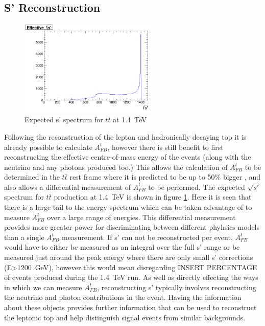 \subsection{S' Reconstruction}

\begin{figure}
  \centering
  \includegraphics[width=0.6\textwidth]{figures/RawSPrime.png}
  \caption[Expected s' spectrum for $t\bar{t}$ at 1.4~TeV]{Expected s' spectrum for $t\bar{t}$ at 1.4~TeV}
  \label{fig:trueSPrime}
\end{figure}

Following the reconstruction of the lepton and hadronically decaying top it is already possible to calculate $A_{FB}^{t}$, however there is still benefit to first reconstructing the effective centre-of-mass energy of the events (along with the neutrino and any photons produced too.) This allows the calculation of $A_{FB}^{t}$ to be determined in the $t\bar{t}$ rest frame where it is predicted to be up to 50\% bigger \cite{Krohn:2011tw}, and also allows a differential measurement of $A_{FB}^{t}$ to be performed. The expected $\sqrt{s'}$ spectrum for $t\bar{t}$ production at 1.4~TeV is shown in figure \ref{fig:trueSPrime}. Here it is seen that there is a large tail to the energy spectrum which can be taken advantage of to measure $A_{FB}^{t}$ over a large range of energies. This differential measurement provides more greater power for discriminating between different phyhsics models than a single $A_{FB}^{t}$ measurement. If s' can not be reconstructed per event, $A_{FB}^{t}$ would have to either be measured as an integral over the full s' range or be measured just around the peak energy where there are only small s' corrections (E>1200~GeV), however this would mean disregarding INSERT PERCENTAGE of events produced during the 1.4~TeV run. As well as directly effecting the ways in which we can measure $A_{FB}^{t}$, reconstructing s' typically involves reconstructing the neutrino and photon contributions in the event. Having the information about these objects provides further information that can be used to reconstruct the leptonic top and help distinguish signal events from similar backgrounds.

